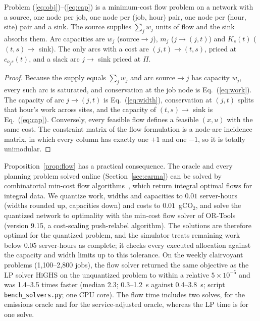 \begin{proposition}\label{prop:flow}
Problem (\ref{eq:obj})--(\ref{eq:cap}) is a minimum-cost flow problem on a network with a source, one node per job, one node per (job, hour) pair, one node per (hour, site) pair and a sink. The source supplies $\sum_jw_j$ units of flow and the sink absorbs them. Arc capacities are $w_j$ (source$\to j$), $m_j$ ($j\to(j,t)$) and $K_s(t)$ ($(t,s)\to$ sink). The only arcs with a cost are $(j,t)\to(t,s)$, priced at $c_{o_j s}(t)$, and a slack arc $j\to$ sink priced at $\Pi$.
\end{proposition}
\begin{proof}
Because the supply equals $\sum_jw_j$ and arc source$\to j$ has capacity $w_j$, every such arc is saturated, and conservation at the job node is Eq.~(\ref{eq:work}). The capacity of arc $j\to(j,t)$ is Eq.~(\ref{eq:width}), conservation at $(j,t)$ splits that hour's work across sites, and the capacity of $(t,s)\to$ sink is Eq.~(\ref{eq:cap}). Conversely, every feasible flow defines a feasible $(x,u)$ with the same cost. The constraint matrix of the flow formulation is a node-arc incidence matrix, in which every column has exactly one $+1$ and one $-1$, so it is totally unimodular.
\end{proof}

Proposition~\ref{prop:flow} has a practical consequence. The oracle and every planning problem solved online (Section~\ref{sec:carma}) can be solved by combinatorial min-cost flow algorithms~\cite{ahuja1993network}, which return integral optimal flows for integral data. We quantize work, widths and capacities to $0.01$ server-hours (widths rounded up, capacities down) and costs to $0.01$~gCO$_2$, and solve the quantized network to optimality with the min-cost flow solver of OR-Tools~\cite{ortools} (version 9.15, a cost-scaling push-relabel algorithm). The solutions are therefore optimal for the quantized problem, and the simulator treats remaining work below 0.05 server-hours as complete; it checks every executed allocation against the capacity and width limits up to this tolerance. On the weekly clairvoyant problems (1{,}100--2{,}800 jobs), the flow solver returned the same objective as the LP solver HiGHS on the unquantized problem to within a relative $5\times10^{-5}$ and was 1.4--3.5 times faster (median 2.3; 0.3--1.2~s against 0.4--3.8~s; script \texttt{bench\_solvers.py}; one CPU core). The flow time includes two solves, for the emissions oracle and for the service-adjusted oracle, whereas the LP time is for one solve.

